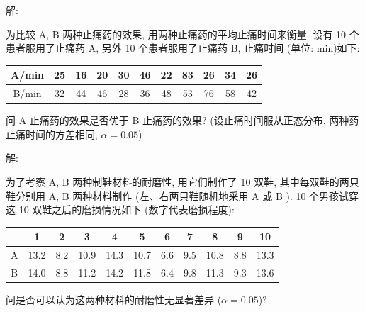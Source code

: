 \documentclass[standard]{ExBook}
\begin{document}
\begin{qitems}
\vspace{-5em}

    \begin{bbox}
解: 
    \end{bbox}

\vspace{-5em}

    \begin{bbox}
    \begin{shaded}
        \qitem
为比较 A, B 两种止痛药的效果, 用两种止痛药的平均止痛时间来衡量. 设有 10 个患者服用了止痛药 A, 另外 10 个患者服用了止痛药 B, 止痛时间 (单位: min)如下:
\begin{center}
\setlength{\tabcolsep}{15pt}
\begin{tabular}{c|cccccccccc}
\hline
A/min & 25 & 16 & 20 & 30 & 46 & 22 & 83 & 26 & 34 & 26 \\
\hline
B/min & 32 & 44 & 46 & 28 & 36 & 48 & 53 & 76 & 58 & 42 \\
\hline
\end{tabular}
\end{center}
问 A 止痛药的效果是否优于 B 止痛药的效果? (设止痛时间服从正态分布, 两种药止痛时间的方差相同, $\alpha = 0.05$)
    \end{shaded}
    \end{bbox}

\vspace{-5em}

    \begin{bbox}
解: 
    \end{bbox}

\vspace{-5em}

    \begin{bbox}
    \begin{shaded}
        \qitem
为了考察 A, B 两种制鞋材料的耐磨性, 用它们制作了 10 双鞋, 其中每双鞋的两只鞋分别用 A, B 两种材料制作 (左、右两只鞋随机地采用 A 或 B ). 10 个男孩试穿这 10 双鞋之后的磨损情况如下 (数字代表磨损程度):
\begin{center}
\setlength{\tabcolsep}{13pt}
\begin{tabular}{c|cccccccccc}
\hline
 & 1 & 2 & 3 & 4 & 5 & 6 & 7 & 8 & 9 & 10 \\
\hline
A & 13.2 & 8.2 & 10.9 & 14.3 & 10.7 & 6.6 & 9.5 & 10.8 & 8.8 & 13.3 \\
B & 14.0 & 8.8 & 11.2 & 14.2 & 11.8 & 6.4 & 9.8 & 11.3 & 9.3 & 13.6 \\
\hline
\end{tabular}
\end{center}
问是否可以认为这两种材料的耐磨性无显著差异 ($\alpha=0.05$)?
    \end{shaded}
    \end{bbox}


\end{qitems}
\end{document}
